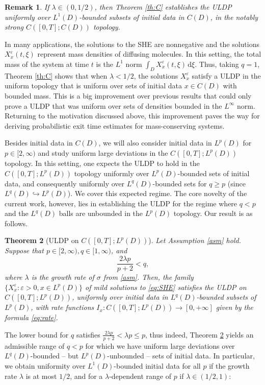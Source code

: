 \documentclass[10pt,a4paper]{amsart}
\newtheorem{theorem}{Theorem}[section]
\newtheorem{remark}[theorem]{Remark}
\numberwithin{equation}{section}
\newcommand{\col}{\colon}
\newcommand{\eps}{\varepsilon}
\newcommand{\dd}{\,\mathrm{d}}
\newcommand{\into}{\hookrightarrow}
\begin{document}
\begin{remark}
If $\lambda\in(0,1/2)$, then  Theorem \ref{th:C} establishes the ULDP uniformly over $L^1(D)$-bounded subsets of initial data in $C(D)$, in the notably strong $C([0,T];C(D))$ topology. 
\end{remark} 

In many applications, the solutions to the SHE are nonnegative and the solutions $X^\eps_x(t,\xi)$ represent mass densities of diffusing molecules. In this setting, the total mass of the system at time $t$ is the $L^1$ norm $\int_D X^\eps_x(t,\xi)\dd \xi$. Thus, taking $q=1$, Theorem \ref{th:C}  shows that when $\lambda<1/2$, the solutions $X^\eps_x$ satisfy a ULDP in the uniform topology that is uniform over sets of initial data $x\in C(D)$ with bounded mass. This is a big improvement over previous results that could only prove a ULDP that was uniform over sets of densities bounded in the $L^\infty$ norm. Returning to the motivation discussed above, this improvement paves the way for deriving probabilistic exit time estimates for mass-conserving systems. 



Besides initial data in $C(D)$, we will also consider initial data in $L^p(D)$ for $p\in[2,\infty)$ and study uniform large deviations in the  $C([0,T];L^p(D))$ topology.  
In this setting, one expects the ULDP to hold in the $C([0,T];L^p(D))$ topology  uniformly over $L^p(D)$-bounded sets of initial data, and consequently uniformly over $L^q(D)$-bounded sets  for $q\geq p$ (since $L^q(D)\into L^p(D)$). 
We cover this expected regime. The core novelty of the current work, however, lies in establishing the ULDP  for the  regime where $q<p$ and the $L^q(D)$ balls are unbounded in the $L^p(D)$ topology. Our result is as follows. 

\begin{theorem}[{ULDP on $C([0,T];L^p(D))$}]\label{th:Lp}  
Let Assumption \ref{asm} hold. Suppose that $p\in[2,\infty), q\in[1,\infty)$, and  
\begin{equation*} 
\frac{2\lambda p}{p+2}< q,  
\end{equation*}
where $\lambda$ is the growth rate of $\sigma$ from \eqref{asm}. 
Then, the family $\{X_x^{\eps}:\eps>0,x\in L^p(D)\}$ of mild solutions to \eqref{eq:SHE}  satisfies the ULDP on $C([0,T];L^p(D))$, uniformly over initial data in $L^q(D)$-bounded subsets of $L^p(D)$, with rate functions $I_x\col C([0,T];L^p(D))\to [0,+\infty]$ given by the formula \eqref{eq:rate}. 
\end{theorem} 
The lower bound for $q$ satisfies $\frac{2\lambda p}{p+2}<\lambda p\leq p$, thus indeed, Theorem \ref{th:Lp} yields an admissible range of $q<p$  for which we have uniform large deviations over $L^q(D)$-bounded -- but  $L^p(D)$-unbounded -- sets of initial data. In particular, we obtain uniformity over $L^1(D)$-bounded initial data for all $p$ if the growth rate $\lambda$ is at most $1/2$, and for a $\lambda$-dependent range of $p$ if $\lambda\in (1/2,1)$:
\end{document}
